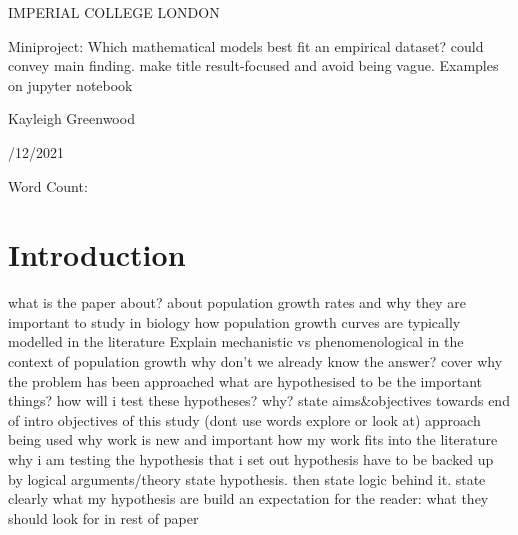 \documentclass[11pt, titlepage]{article}
\newcommand{\wordcount}{}
\begin{document}
    \begin{titlepage}
    \begin{center}
            {\large IMPERIAL COLLEGE LONDON}
    \end{center}
    
    \vspace*{\fill}
    
    \begin{center}
        {\Huge Miniproject: Which mathematical models best fit an empirical dataset? could convey main finding. make title result-focused and avoid being vague. Examples on jupyter notebook}
    
        \bigskip
        Kayleigh Greenwood

        /12/2021

        \bigskip
        Word Count:
        \wordcount

    \end{center}
    
    \vspace{\fill}
    
    \end{titlepage}

    \begin{abstract}
    write at the end
    1-2 lines on background
    1-2 lines on objectives
    1-2 lines on methods
    1-2 lines on main results
    1-2 lines on main conclusions + take home messages (dont be vague eg more work is needed or x is useful)
    about 200 words
    \end{abstract}

    \section*{Introduction}
    
    what is the paper about?    
        about population growth rates and why they are important to study in biology
        how population growth curves are typically modelled in the literature
        Explain mechanistic vs phenomenological in the context of population growth
    why don't we already know the answer?
        cover why the problem has been approached 
    what are hypothesised to be the important things?
    how will i test these hypotheses? why? 
        state aims&objectives towards end of intro
        objectives of this study (dont use words explore or look at)
        approach being used
        why work is new and important
        how my work fits into the literature
        why i am testing the hypothesis that i set out
        hypothesis have to be backed up by logical arguments/theory
        state hypothesis. then state logic behind it.
        state clearly what my hypothesis are
        build an expectation for the reader: what they should look for in rest of paper
\end{document}
